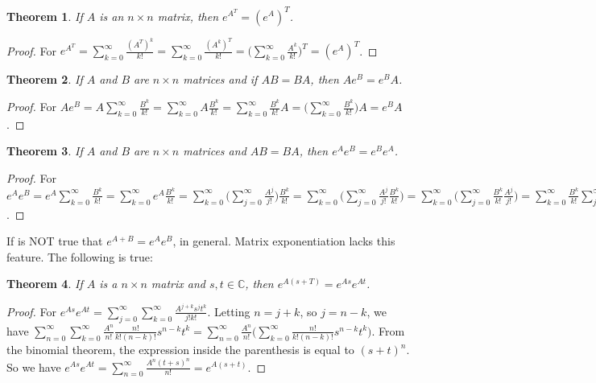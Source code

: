 \documentclass[oneside]{book}
\newtheorem{theorem}{Theorem}[section]
\theoremstyle{definition}
\begin{document}
\begin{theorem}
If $A$ is an $n\times n$ matrix, then $e^{A^T} = (e^A)^T$.
\end{theorem}
\begin{proof}
For $e^{A^T} = \sum_{k=0}^{\infty} \frac{(A^T)^k}{k!} = \sum_{k=0}^{\infty} \frac{(A^k)^T}{k!} = \big(\sum_{k=0}^{\infty} \frac{A^k}{k!}\big)^T = (e^A)^T$.
\end{proof}

\begin{theorem}
If $A$ and $B$ are $n\times n$ matrices and if $AB = BA$, then $Ae^B = e^B A$.
\end{theorem}
\begin{proof}
For $Ae^B = A\sum_{k=0}^{\infty} \frac{B^k}{k!} = \sum_{k=0}^{\infty} A\frac{B^k}{k!} = \sum_{k=0}^{\infty} \frac{B^k}{k!}A = \big(\sum_{k=0}^{\infty} \frac{B^k}{k!}\big)A = e^BA$.
\end{proof}

\begin{theorem}
If $A$ and $B$ are $n\times n$ matrices and $AB = BA$, then $e^{A}e^{B} = e^{B}e^{A}$.
\end{theorem}
\begin{proof}
For $e^A e^B = e^A\sum_{k=0}^{\infty} \frac{B^k}{k!} = \sum_{k=0}^{\infty} e^A\frac{B^k}{k!} = \sum_{k=0}^{\infty} \big(\sum_{j=0}^{\infty} \frac{A^j}{j!}\big) \frac{B^k}{k!} = \sum_{k=0}^{\infty}\big(\sum_{j=0}^{\infty} \frac{A^j}{j!}\frac{B^k}{k!}\big) = \sum_{k=0}^{\infty}\big(\sum_{j=0}^{\infty} \frac{B^k}{k!}\frac{A^j}{j!}\big) = \sum_{k=0}^{\infty} \frac{B^k}{k!} \sum_{j=0}^{\infty} \frac{A^j}{j!} = e^Be^A$.
\end{proof}

If is NOT true that $e^{A+B} = e^Ae^B$, in general. Matrix exponentiation lacks this feature. The following is true:

\begin{theorem}
If $A$ is a $n\times n$ matrix and $s,t\in \mathbb{C}$, then $e^{A(s+T)} = e^{As}e^{At}$.
\end{theorem}
\begin{proof}
For $e^{As}e^{At} = \sum_{j=0}^{\infty} \sum_{k=0}^{\infty} \frac{A^{j+k}s^jt^k}{j!k!}$. Letting $n = j+k$, so $j = n-k$, we have $\sum_{n=0}^{\infty} \sum_{k=0}^{\infty} \frac{A^n}{n!}\frac{n!}{k!(n-k)!}s^{n-k}t^k = \sum_{n=0}^{\infty}\frac{A^n}{n!}\big(\sum_{k=0}^{\infty} \frac{n!}{k!(n-k)!}s^{n-k}t^k\big)$. From the binomial theorem, the expression inside the parenthesis is equal to $(s+t)^n$. So we have $e^{As}e^{At}=\sum_{n=0}^{\infty} \frac{A^n(t+s)^n}{n!} = e^{A(s+t)}$.
\end{proof}
\end{document}
